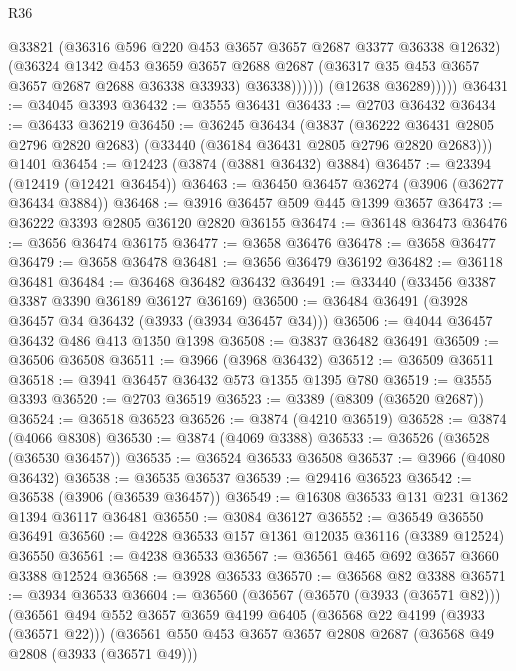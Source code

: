 \begin{lexlean}{R36}
\begin{coremodule}
                      @33821
                      (@36316 @596 @220 @453 @3657 @3657 @2687 @3377 @36338 @12632)
                      (@36324
                        @1342
                        @453
                        @3659
                        @3657
                        @2688
                        @2687
                        (@36317 @35 @453 @3657 @3657 @2687 @2688 @36338 @33933)
                        @36338))))))
            (@12638 @36289)))))
@36431 := @34045 @3393
@36432 := @3555 @36431
@36433 := @2703 @36432
@36434 := @36433 @36219
@36450 := @36245
    @36434
    (@3837 (@36222 @36431 @2805 @2796 @2820 @2683) (@33440 (@36184 @36431 @2805 @2796 @2820 @2683)))
    @1401
@36454 := @12423 (@3874 (@3881 @36432) @3884)
@36457 := @23394 (@12419 (@12421 @36454))
@36463 := @36450 @36457 @36274 (@3906 (@36277 @36434 @3884))
@36468 := @3916 @36457 @509 @445 @1399 @3657
@36473 := @36222 @3393 @2805 @36120 @2820 @36155
@36474 := @36148 @36473
@36476 := @3656 @36474 @36175
@36477 := @3658 @36476
@36478 := @3658 @36477
@36479 := @3658 @36478
@36481 := @3656 @36479 @36192
@36482 := @36118 @36481
@36484 := @36468 @36482 @36432
@36491 := @33440 (@33456 @3387 @3387 @3390 @36189 @36127 @36169)
@36500 := @36484 @36491 (@3928 @36457 @34 @36432 (@3933 (@3934 @36457 @34)))
@36506 := @4044 @36457 @36432 @486 @413 @1350 @1398
@36508 := @3837 @36482 @36491
@36509 := @36506 @36508
@36511 := @3966 (@3968 @36432)
@36512 := @36509 @36511
@36518 := @3941 @36457 @36432 @573 @1355 @1395 @780
@36519 := @3555 @3393
@36520 := @2703 @36519
@36523 := @3389 (@8309 (@36520 @2687))
@36524 := @36518 @36523
@36526 := @3874 (@4210 @36519)
@36528 := @3874 (@4066 @8308)
@36530 := @3874 (@4069 @3388)
@36533 := @36526 (@36528 (@36530 @36457))
@36535 := @36524 @36533 @36508
@36537 := @3966 (@4080 @36432)
@36538 := @36535 @36537
@36539 := @29416 @36523
@36542 := @36538 (@3906 (@36539 @36457))
@36549 := @16308 @36533 @131 @231 @1362 @1394 @36117 @36481
@36550 := @3084 @36127
@36552 := @36549 @36550 @36491
@36560 := @4228 @36533 @157 @1361 @12035 @36116 (@3389 @12524) @36550
@36561 := @4238 @36533
@36567 := @36561 @465 @692 @3657 @3660 @3388 @12524
@36568 := @3928 @36533
@36570 := @36568 @82 @3388
@36571 := @3934 @36533
@36604 := @36560
    (@36567
      (@36570 (@3933 (@36571 @82)))
      (@36561
        @494
        @552
        @3657
        @3659
        @4199
        @6405
        (@36568 @22 @4199 (@3933 (@36571 @22)))
        (@36561
          @550
          @453
          @3657
          @3657
          @2808
          @2687
          (@36568 @49 @2808 (@3933 (@36571 @49)))

\end{coremodule}
\end{lexlean}
